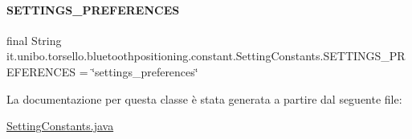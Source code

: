 \hypertarget{classit_1_1unibo_1_1torsello_1_1bluetoothpositioning_1_1constant_1_1SettingConstants_ae1b406c787a7efb87d585d5c8b80493d_ae1b406c787a7efb87d585d5c8b80493d}{}\label{classit_1_1unibo_1_1torsello_1_1bluetoothpositioning_1_1constant_1_1SettingConstants_ae1b406c787a7efb87d585d5c8b80493d_ae1b406c787a7efb87d585d5c8b80493d} 
\paragraph{\texorpdfstring{S\+E\+T\+T\+I\+N\+G\+S\+\_\+\+P\+R\+E\+F\+E\+R\+E\+N\+C\+ES}{SETTINGS\_PREFERENCES}}
{\footnotesize\ttfamily final String it.\+unibo.\+torsello.\+bluetoothpositioning.\+constant.\+Setting\+Constants.\+S\+E\+T\+T\+I\+N\+G\+S\+\_\+\+P\+R\+E\+F\+E\+R\+E\+N\+C\+ES = \char`\"{}settings\+\_\+preferences\char`\"{}\hspace{0.3cm}{\ttfamily [static]}}



La documentazione per questa classe è stata generata a partire dal seguente file\+:\begin{DoxyCompactItemize}
\item 
\hyperlink{SettingConstants_8java}{Setting\+Constants.\+java}\end{DoxyCompactItemize}
